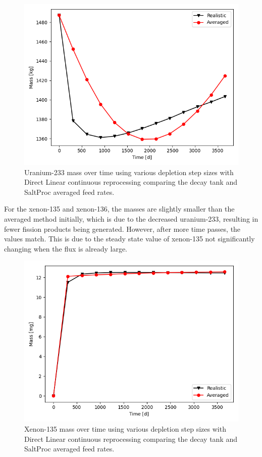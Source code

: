 \begin{figure}[H]
  \centering
  \includegraphics[scale=0.7]{images/adv-U233.png}
  \caption{Uranium-233 mass over time using various depletion step sizes with Direct Linear continuous reprocessing comparing the decay tank and SaltProc averaged feed rates.}
   \label{fig:DL-cont-u-adv}
\end{figure}

For the xenon-135 and xenon-136, the masses are slightly smaller than the averaged method initially, which is due to the decreased uranium-233, resulting in fewer fission products being generated. However, after more time passes, the values match. This is due to the steady state value of xenon-135 not significantly changing when the flux is already large.

\begin{figure}[H]
  \centering
  \includegraphics[scale=0.7]{images/adv-Xe135.png}
  \caption{Xenon-135 mass over time using various depletion step sizes with Direct Linear continuous reprocessing comparing the decay tank and SaltProc averaged feed rates.}
   \label{fig:DL-cont-xe135-adv}
\end{figure}

